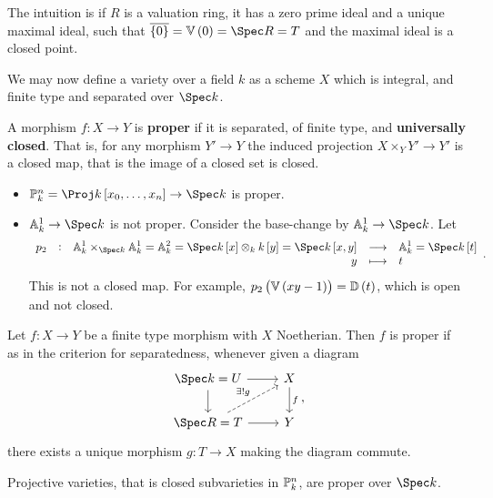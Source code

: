 
The intuition is if $ R $ is a valuation ring, it has a zero prime ideal and a unique maximal ideal, such that $ \overline{\cbr{0}} = \VV\br{0} = \Spec R = T $ and the maximal ideal is a closed point.

\begin{remark*}
We may now define a variety over a field $ k $ as a scheme $ X $ which is integral, and finite type and separated over $ \Spec k $.
\end{remark*}

\begin{definition*}
A morphism $ f : X \to Y $ is \textbf{proper} if it is separated, of finite type, and \textbf{universally closed}. That is, for any morphism $ Y' \to Y $ the induced projection $ X \times_Y Y' \to Y' $ is a closed map, that is the image of a closed set is closed.
\end{definition*}

\begin{example*}
\hfill
\begin{itemize}
\item $ \PP_k^n = \Proj k\sbr{x_0, \dots, x_n} \to \Spec k $ is proper.
\item $ \AA_k^1 \to \Spec k $ is not proper. Consider the base-change by $ \AA_k^1 \to \Spec k $. Let
$$ \function[p_2]{\AA_k^1 \times_{\Spec k} \AA_k^1 = \AA_k^2 = \Spec k\sbr{x} \otimes_k k\sbr{y} = \Spec k\sbr{x, y}}{\AA_k^1 = \Spec k\sbr{t}}{y}{t}. $$
This is not a closed map. For example, $ p_2\br{\VV\br{xy - 1}} = \DD\br{t} $, which is open and not closed.
\end{itemize}
\end{example*}

\begin{theorem}
Let $ f : X \to Y $ be a finite type morphism with $ X $ Noetherian. Then $ f $ is proper if as in the criterion for separatedness, whenever given a diagram
$$
\begin{tikzcd}
\Spec k = U \arrow{r} \arrow{d} & X \arrow{d}{f} \\
\Spec R = T \arrow[dashed]{ur}{\exists !g} \arrow{r} & Y
\end{tikzcd},
$$
there exists a unique morphism $ g : T \to X $ making the diagram commute.
\end{theorem}

\begin{example*}
Projective varieties, that is closed subvarieties in $ \mathbb{P}_k^n $, are proper over $ \Spec k $.
\end{example*}

